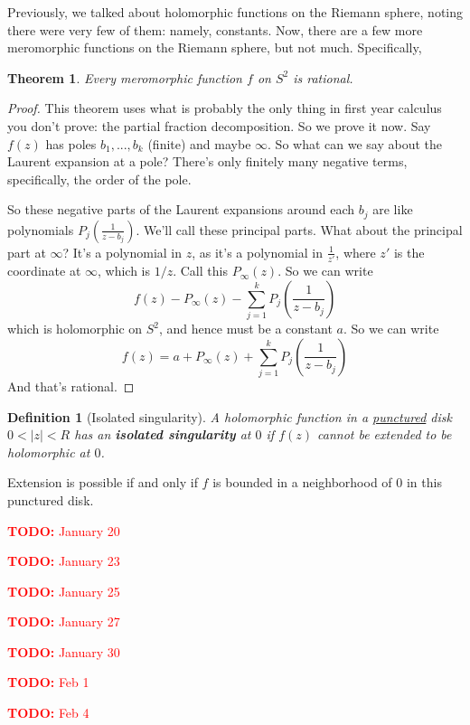 \documentclass{article}
\newtheorem{theorem}{Theorem}
\newtheorem{definition}{Definition}
\newcommand{\TODO}[1]{\begin{center}\huge{\textcolor{red}{\textbf{TODO:} #1}}\end{center}}
\begin{document}
Previously, we talked about holomorphic functions on the Riemann sphere, noting there were very few of them: namely, constants. Now, there are a few more meromorphic functions on the Riemann sphere, but not much. Specifically,
\begin{theorem}
Every meromorphic function \(f\) on \(S^2\) is rational.
\end{theorem}
\begin{proof}
This theorem uses what is probably the only thing in first year calculus you don't prove: the partial fraction decomposition. So we prove it now.
Say \(f(z)\) has poles \(b_1,...,b_k\) (finite) and maybe \(\infty\). So what can we say about the Laurent expansion at a pole? There's only finitely many negative terms, specifically, the order of the pole.

So these negative parts of the Laurent expansions around each \(b_j\) are like polynomials \(P_j(\frac{1}{z - b_j})\). We'll call these principal parts. What about the principal part at \(\infty\)? It's a polynomial in \(z\), as it's a polynomial in \(\frac{1}{z'}\), where \(z'\) is the coordinate at \(\infty\), which is \(1/z\). Call this \(P_\infty(z)\). So we can write
\begin{equation}f(z) - P_\infty(z) - \sum_{j = 1}^kP_j\left(\frac{1}{z - b_j}\right)\end{equation}
which is holomorphic on \(S^2\), and hence must be a constant \(a\). So we can write
\begin{equation}f(z) = a + P_\infty(z) + \sum_{j = 1}^kP_j\left(\frac{1}{z - b_j}\right)\end{equation}
And that's rational.
\end{proof}
\begin{definition}[Isolated singularity]
A holomorphic function in a \underline{punctured} disk \(0 < |z| < R\) has an \textbf{isolated singularity} at \(0\) if \(f(z)\) cannot be extended to be holomorphic at \(0\).
\end{definition}
Extension is possible if and only if \(f\) is bounded in a neighborhood of \(0\) in this punctured disk.

\TODO{January 20}

\TODO{January 23}

\TODO{January 25}

\TODO{January 27}

\TODO{January 30}

\TODO{Feb 1}

\TODO{Feb 4}
\end{document}
